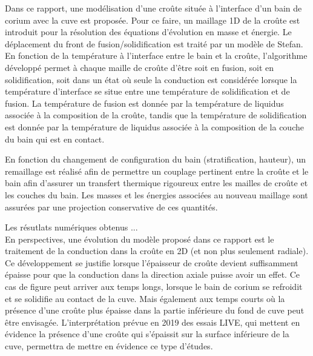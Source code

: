 Dans ce rapport, une modélisation d'une croûte située à l'interface d'un bain de corium avec la cuve est proposée. Pour ce faire, un maillage 1D de la croûte est introduit pour la résolution des équations d'évolution en masse et énergie. Le déplacement du front de fusion/solidification est traité par un modèle de Stefan. En fonction de la température à l'interface entre le bain et la croûte, l'algorithme développé permet à chaque maille de croûte d'être soit en fusion, soit en solidification, soit dans un état où seule la conduction est considérée lorsque la température d'interface se situe entre une température de solidification et de fusion. La température de fusion est donnée par la température de liquidus associée à la composition de la croûte, tandis que la température de solidification est donnée par la température de liquidus associée à la composition de la couche du bain qui est en contact. 

En fonction du changement de configuration du bain (stratification, hauteur), un remaillage est réalisé afin de permettre un couplage pertinent entre la croûte et le bain afin d'assurer un transfert thermique rigoureux entre les mailles de croûte et les couches du bain. Les masses et les énergies associées au nouveau maillage sont assurées par une projection conservative de ces quantités.

Les résutlats numériques obtenus ...\\

En perspectives, une évolution du modèle proposé dans ce rapport est le traitement de la conduction dans la croûte en 2D (et non plus seulement radiale). Ce développement se justifie lorsque l'épaisseur de croûte devient suffisamment épaisse pour que la conduction dans la direction axiale puisse avoir un effet. Ce cas de figure peut arriver aux temps longs, lorsque le bain de corium se refroidit et se solidifie au contact de la cuve. Mais également aux temps courts où la présence d'une croûte plus épaisse dans la partie inférieure du fond de cuve peut être envisagée. L'interprétation prévue en 2019 des essais LIVE, qui mettent en évidence la présence d'une croûte qui s'épaissit sur la surface inférieure de la cuve, permettra de mettre en évidence ce type d'études.   